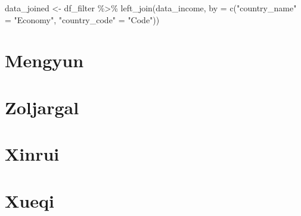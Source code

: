 \documentclass[11pt,a4paper,]{article}
\newenvironment{Shaded}{\begin{snugshade}}{\end{snugshade}}
\newcommand{\AttributeTok}[1]{\textcolor[rgb]{0.77,0.63,0.00}{#1}}
\newcommand{\FunctionTok}[1]{\textcolor[rgb]{0.00,0.00,0.00}{#1}}
\newcommand{\NormalTok}[1]{#1}
\newcommand{\OtherTok}[1]{\textcolor[rgb]{0.56,0.35,0.01}{#1}}
\newcommand{\SpecialCharTok}[1]{\textcolor[rgb]{0.00,0.00,0.00}{#1}}
\newcommand{\StringTok}[1]{\textcolor[rgb]{0.31,0.60,0.02}{#1}}
\begin{document}
\begin{Shaded}
\begin{Highlighting}[]
\NormalTok{data\_joined }\OtherTok{\textless{}{-}}\NormalTok{ df\_filter }\SpecialCharTok{\%\textgreater{}\%} 
    \FunctionTok{left\_join}\NormalTok{(data\_income, }\AttributeTok{by =} \FunctionTok{c}\NormalTok{(}\StringTok{"country\_name"} \OtherTok{=} \StringTok{"Economy"}\NormalTok{,}
                                \StringTok{"country\_code"} \OtherTok{=} \StringTok{"Code"}\NormalTok{)) }
\end{Highlighting}
\end{Shaded}

\section*{Mengyun}

\section*{Zoljargal}

\section*{Xinrui}

\section*{Xueqi}
\end{document}
